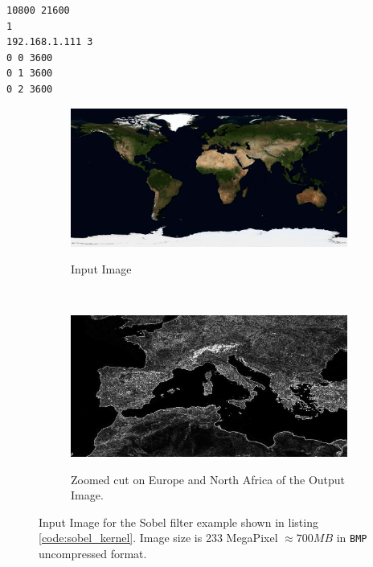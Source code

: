 \begin{lstlisting}[float]
10800 21600
1
192.168.1.111 3
0 0 3600
0 1 3600
0 2 3600
\end{lstlisting}



\begin{figure}
	\begin{subfigure}{1.0\textwidth}
		\caption{Input Image}
		\includegraphics[width=\linewidth]{./images/opencal/sobel_input}
		\label{fig:sobel_input}
		
	\end{subfigure}	
	\endminipage\hfill \\
		\begin{subfigure}{1.0\textwidth}
		\includegraphics[width=\linewidth]{./images/opencal/sobel_output_detail}
		\label{fig:sobel_output_detail}
		\caption{Zoomed cut on Europe and North Africa of the Output Image.}
	\end{subfigure}
	\endminipage
		\caption{Input Image for the Sobel filter example shown in listing \ref{code:sobel_kernel}. Image size is 233 MegaPixel $\approx 700  \si{MB}$ in \texttt{BMP} uncompressed format.}
		\label{fig:sobel_result}
\end{figure}

